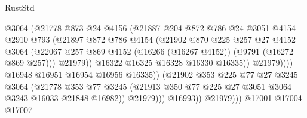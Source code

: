 \begin{lexlean}{RustStd}
\begin{coremodule}
                                    @3064
                                    (@21778
                                      @873
                                      @24
                                      @4156
                                      (@21887
                                        @204
                                        @872
                                        @786
                                        @24
                                        @3051
                                        @4154
                                        @2910
                                        @793
                                        (@21897
                                          @872
                                          @786
                                          @4154
                                          (@21902
                                            @870
                                            @225
                                            @257
                                            @27
                                            @4152
                                            @3064
                                            (@22067
                                              @257
                                              @869
                                              @4152
                                              (@16266 (@16267 @4152))
                                              (@9791 (@16272 @869 @257)))
                                            @21979))
                                        @16322
                                        @16325
                                        @16328
                                        @16330
                                        @16335))
                                    @21979))))
                            @16948
                            @16951
                            @16954
                            @16956
                            @16335))
                        (@21902
                          @353
                          @225
                          @77
                          @27
                          @3245
                          @3064
                          (@21778
                            @353
                            @77
                            @3245
                            (@21913 @350 @77 @225 @27 @3051 @3064 @3243 @16033 @21848 @16982))
                          @21979)))
                    @16993))
                @21979)))
          @17001
          @17004
          @17007

\end{coremodule}
\end{lexlean}

